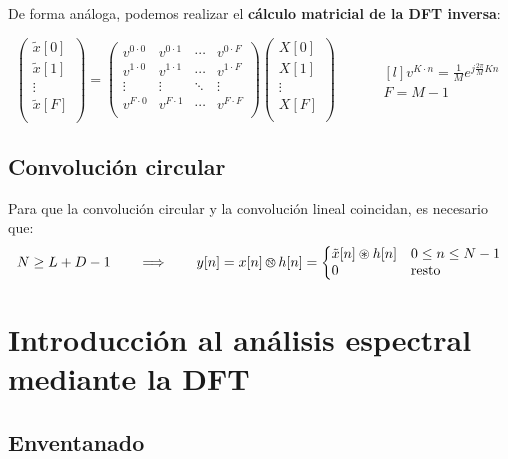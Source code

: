 \documentclass[a4paper,oneside]{book}
\begin{document}
De forma análoga, podemos realizar el \textbf{cálculo matricial de la DFT inversa}:

\[ \left( \begin{matrix}
	\tilde{x}[0]\\
	\tilde{x}[1]\\
	\vdots\\
	\tilde{x}[F]\\
\end{matrix} \right)
= \left(
\begin{matrix}
	v^{0 \cdot 0} & v^{0 \cdot 1} & \cdots & v^{0 \cdot F}\\
	v^{1 \cdot 0} & v^{1 \cdot 1} & \cdots & v^{1 \cdot F}\\
	\vdots & \vdots & \ddots & \vdots \\
	v^{F \cdot 0} & v^{F \cdot 1} & \cdots & v^{F \cdot F}\\
\end{matrix} \right)
\left( 
\begin{matrix}
	X[0]\\
	X[1]\\
	\vdots \\
	X[F]\\
\end{matrix} \right)
\qquad \quad 
\begin{matrix*}[l]
	v^{K \cdot n} = \frac{1}{M} e^{j \frac{2\pi}{M}Kn}\\[5pt]
	F = M - 1
\end{matrix*}
\]

\subsection{Convolución circular}

Para que la convolución circular y la convolución lineal coincidan, es necesario que:
\[ N \geq L+D-1 \qquad \Longrightarrow \qquad y[n]=x[n] \circConvUnknown h[n] = \left\lbrace 
\begin{matrix*}[l]
	\tilde{x}[n] \circledast h[n] & 0 \leq n \leq N-1\\ 
	0 & \textrm{resto}
\end{matrix*} \right.\]

\section{Introducción al análisis espectral mediante la DFT}

\subsection{Enventanado}
\end{document}
